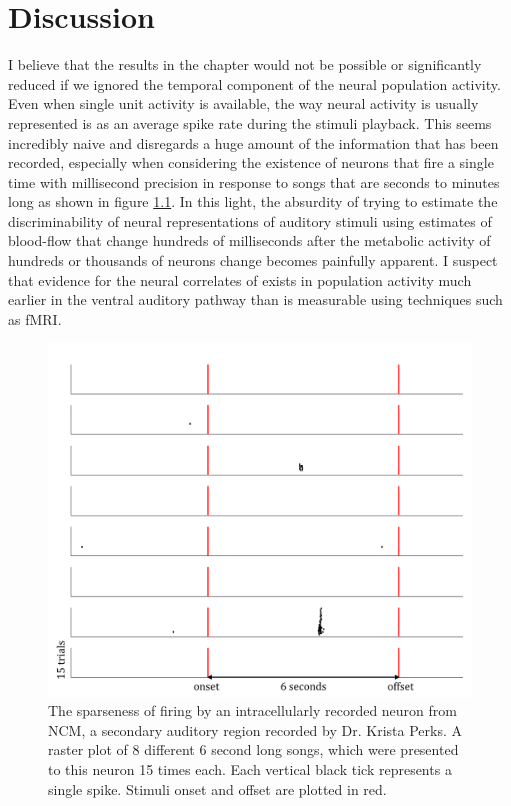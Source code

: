 \chapter{Discussion}
I believe that the results in the \CP chapter would not be possible or significantly reduced if we ignored the temporal component of the neural population activity. Even when single unit activity is available, the way neural activity is usually represented is as an average spike rate during the stimuli playback. This seems incredibly naive and disregards a huge amount of the information that has been recorded, especially when considering the existence of neurons that fire a single time with millisecond precision in response to songs that are seconds to minutes long as shown in figure \ref{fig:sparse}. In this light, the absurdity of trying to estimate the discriminability of neural representations of auditory stimuli using estimates of blood-flow that change hundreds of milliseconds after the metabolic activity of hundreds or thousands of neurons change becomes painfully apparent. I suspect that evidence for the neural correlates of \CP exists in population activity much earlier in the ventral auditory pathway than is measurable using techniques such as fMRI.

\begin{figure}[tbp] 
  \centering
  \includegraphics[width=.9\textwidth]{figures/sparse.png}
  \caption[Sparse firing of NCM neuron.]
{The sparseness of firing by an intracellularly recorded neuron from NCM, a secondary auditory region recorded by Dr. Krista Perks. A raster plot of 8 different 6 second long songs, which were presented to this neuron 15 times each. Each vertical black tick represents a single spike. Stimuli onset and offset are plotted in red.
}
  \label{fig:sparse}
\end{figure}

